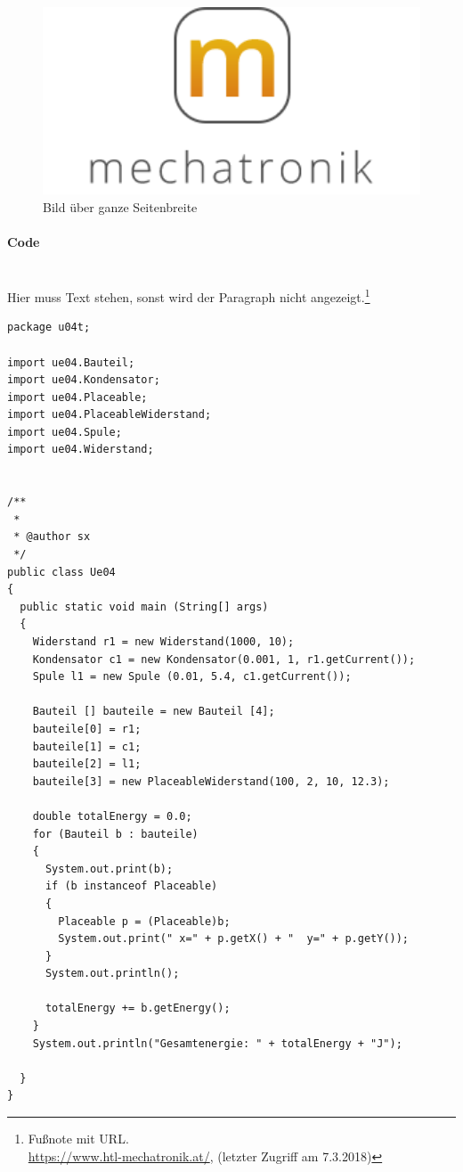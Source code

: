 \begin{figure}[H]
      \includegraphics[width=1\textwidth]{fig/logoMecha}
      \caption{Bild über ganze Seitenbreite}
      \label{Bild über ganze Seitenbreite}
\end{figure}
\newpage

\paragraph{Code}\mbox{}\\
Hier muss Text stehen, sonst wird der Paragraph nicht angezeigt.\footnote{Fußnote mit URL.\\ \url{https://www.htl-mechatronik.at/}, (letzter Zugriff am 7.3.2018)} 

\begin{lstlisting}[style=java,caption=Codebeispiel]
package u04t;

import ue04.Bauteil;
import ue04.Kondensator;
import ue04.Placeable;
import ue04.PlaceableWiderstand;
import ue04.Spule;
import ue04.Widerstand;


/**
 *
 * @author sx
 */
public class Ue04
{
  public static void main (String[] args)
  {
    Widerstand r1 = new Widerstand(1000, 10);
    Kondensator c1 = new Kondensator(0.001, 1, r1.getCurrent());
    Spule l1 = new Spule (0.01, 5.4, c1.getCurrent());
    
    Bauteil [] bauteile = new Bauteil [4];
    bauteile[0] = r1;
    bauteile[1] = c1;
    bauteile[2] = l1;
    bauteile[3] = new PlaceableWiderstand(100, 2, 10, 12.3);
    
    double totalEnergy = 0.0;
    for (Bauteil b : bauteile)
    {
      System.out.print(b);
      if (b instanceof Placeable)
      {
        Placeable p = (Placeable)b;
        System.out.print(" x=" + p.getX() + "  y=" + p.getY());
      }
      System.out.println();
      
      totalEnergy += b.getEnergy();
    }
    System.out.println("Gesamtenergie: " + totalEnergy + "J");
    
  }
}

\end{lstlisting}
\newpage

